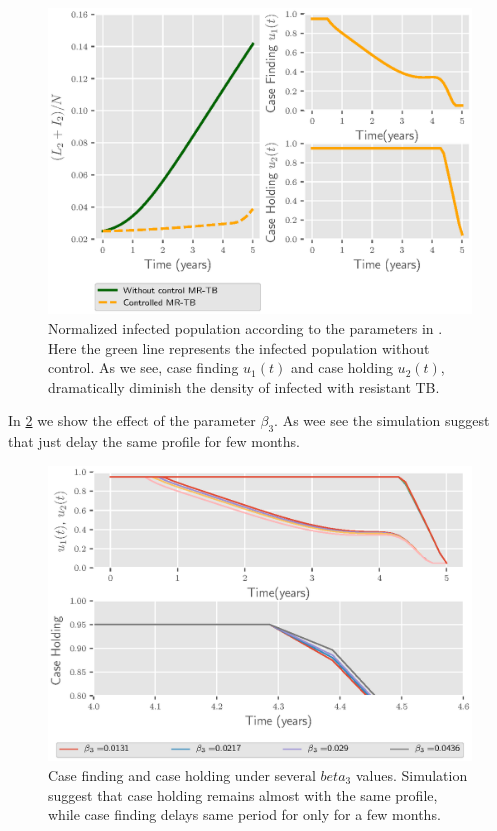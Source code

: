 \begin{figure}
  \centering
  \includegraphics{Figures/figure_1_two_strain_tbm}
  \caption{Normalized infected population according to the parameters in 
  . Here the green line represents the 
  infected population without control. As we see, case finding $u_1(t)$
  and case holding $u_2(t)$, dramatically diminish the
  density of infected with resistant TB.}
  \label{fig:figure1twostraintbm}
\end{figure}


In \cref{fig:figure2twostraintbm} we show the effect of the parameter 
$\beta_3$. As wee see the simulation suggest that just delay the same profile for few
months.

\begin{figure}
  \centering
  \includegraphics{Figures/figure_2_two_strain_tbm}
  \caption{Case finding and case holding under several $beta_3$ values.
  Simulation suggest that case holding remains almost with the same profile, while
  case finding delays same period for only for a few months.}
  \label{fig:figure2twostraintbm}
\end{figure}

